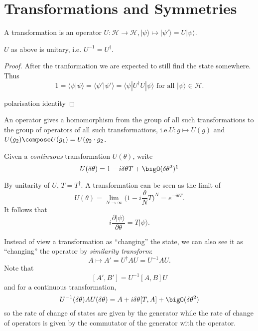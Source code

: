 \documentclass[a4paper]{article}
\renewcommand*{\H}{\mathcal{H}}
\theoremstyle{definition}
\begin{document}
\section{Transformations and Symmetries}

A transformation is an operator \(U:\H\to \H, |\psi\rangle\mapsto |\psi'\rangle = U|\psi\rangle\).

\begin{prop}
  \(U\) as above is unitary, i.e. \(U^{-1} = U^\dag\).
\end{prop}

\begin{proof}
  After the tranformation we are expected to still find the state somewhere. Thus
  \[
    1 = \langle \psi|\psi\rangle = \langle \psi'|\psi' \rangle = \langle \psi |U^\dag U|\psi \rangle \text{ for all } |\psi\rangle \in \H.
  \]

  polarisation identity
\end{proof}

An operator gives a homomorphism from the group of all such transformations to the group of operators of all such transformations, i.e.\(U: g\mapsto U(g)\) and \(U(g_2)\compose U(g_1) = U(g_2\cdot g_2\).

\begin{defi}[Generator]
  Given a \emph{continuous} transformation \(U(\theta)\), write
  \[
    U(\delta\theta) = 1 - i \delta\theta T + \bigO(\delta\theta^2)\footnotemark
  \]
\end{defi}

By unitarity of \(U\), \(T=T^\dag\). A transformation can be seen as the limit of
\[
  U(\theta) = \lim_{N\to \infty}\Big( 1- i \frac{\theta}{N}T \Big)^N = e^{-i\theta T}.
\]
It follows that
\[
  i \frac{\partial |\psi\rangle}{\partial \theta} = T |\psi\rangle.
\]

Instead of view a transformation as ``changing'' the state, we can also see it as ``changing'' the operator by \emph{similarity transform}:
\[
  A \mapsto A' = U^\dag A U = U^{-1} A U.
\]
Note that
\[
  [A',B'] = U^{-1}[A,B]U
\]
and for a continuous transformation,
\[
  U^{-1}(\delta\theta) A U(\delta\theta) = A + i\delta\theta [T,A] + \bigO(\delta\theta^2)
\]
so the rate of change of states are given by the generator while the rate of change of operators is given by the commutator of the generator with the operator.
\end{document}

